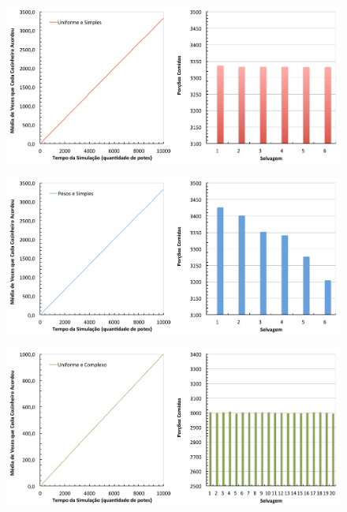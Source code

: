 \documentclass[11pt,a4paper]{article}
\begin{document}
\begin{figure}[htbp]
  \label{fig:us}
  \begin{center}
    \includegraphics[scale=0.5]{uniforme_simples.pdf}
    \caption{}
  \end{center}
\end{figure}

\begin{figure}[htbp]
  \label{fig:ps}
  \begin{center}
    \includegraphics[scale=0.5]{pesos_simples.pdf}
    \caption{}
  \end{center}
\end{figure}

\begin{figure}[htbp]
  \label{fig:uc}
  \begin{center}
    \includegraphics[scale=0.5]{uniforme_complexo.pdf}
    \caption{}
  \end{center}
\end{figure}
\end{document}
